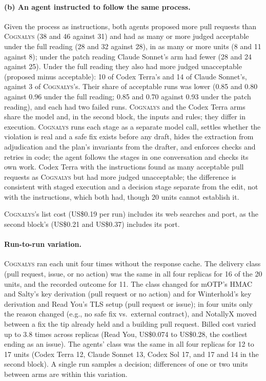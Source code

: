 \documentclass[conference]{IEEEtran}
\newcommand{\system}{\textsc{Cognalys}}
\begin{document}
\paragraph{(b) An agent instructed to follow the same process.}
Given the process as instructions, both agents proposed more pull requests
than \system{} (38 and 46 against 31) and had as many or more judged
acceptable under the full reading (28 and 32 against 28), in as many or more
units (8 and 11 against 8); under the patch reading Claude Sonnet's arm had
fewer (28 and 24 against 25). Under the full reading they also had more judged
unacceptable (proposed minus acceptable): 10 of Codex Terra's and 14 of Claude
Sonnet's, against 3 of \system{}'s. Their share of
acceptable runs was lower (0.85 and 0.80 against 0.96 under the full reading;
0.85 and 0.70 against 0.93 under the patch reading), and each had two failed
runs.
\system{} and the Codex Terra arms share the model and, in the second block,
the inputs and rules; they differ in execution. \system{} runs each stage as a
separate model call, settles whether the violation is real and a safe fix
exists before any draft, hides the extraction from adjudication and the plan's
invariants from the drafter, and enforces checks and retries in code; the agent
follows the stages in one conversation and checks its own work.
Codex Terra with the instructions found as many acceptable pull requests as
\system{} but had more judged unacceptable; the difference is consistent with
staged execution and a decision stage separate from the edit, not with the
instructions, which both had, though 20 units cannot establish it.

\system{}'s list cost
(US\$0.19 per run) includes its web searches and port, as the second block's
(US\$0.21 and US\$0.37) includes its port.

\paragraph{Run-to-run variation.} \system{} ran each unit four times without the
response cache. The delivery class (pull request, issue, or no action) was the
same in all four replicas for 16 of the 20 units, and the recorded outcome for
11. The class changed for mOTP's HMAC and Salty's key derivation (pull request
or no action) and for Winterhold's key derivation and Read You's TLS setup (pull
request or issue); in four units only the reason changed (e.g., no safe fix vs.\
external contract), and NotallyX moved between a fix the tip already held and a
building pull request. Billed cost varied up to 3.8 times across replicas
(Read You, US\$0.074 to US\$0.28, the costliest ending as an issue).
The agents' class was the same in all four replicas for 12 to 17 units
(Codex Terra 12, Claude Sonnet 13, Codex Sol 17, and 17 and 14 in the second
block). A single run samples a
decision; differences of one or two units between arms are within this
variation.
\end{document}
